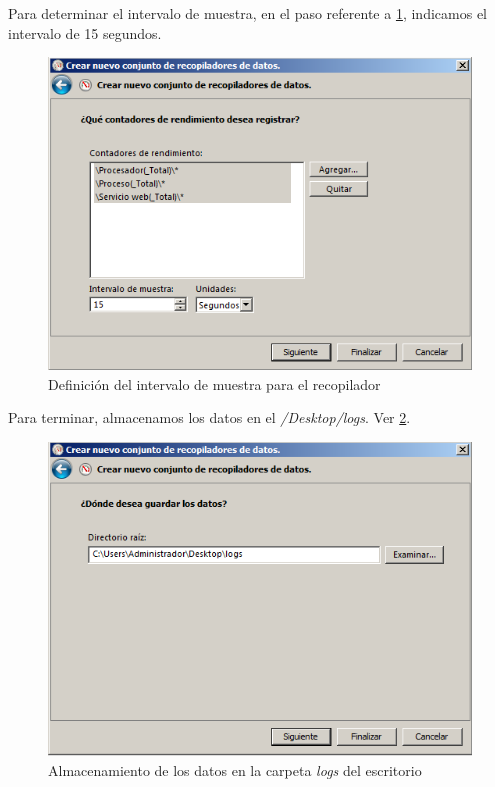 Para determinar el intervalo de muestra, en el paso referente a \ref{cuestion5-muestra}, indicamos el intervalo de 15 segundos.

\begin{figure}[H]
	\centering
	\includegraphics[scale=0.6]{cuestion5-muestra.png}
	\caption{Definición del intervalo de muestra para el recopilador} \label{cuestion5-muestra}
\end{figure}

Para terminar, almacenamos los datos en el \textit{/Desktop/logs}. Ver \ref{cuestion5-escritorio}.

\begin{figure}[H]
	\centering
	\includegraphics[scale=0.6]{cuestion5-escritorio.png}
	\caption{Almacenamiento de los datos en la carpeta \textit{logs} del escritorio} \label{cuestion5-escritorio}
\end{figure}

